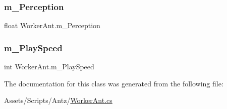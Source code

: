 \mbox{\label{class_worker_ant_ac8f5e0080f43089ba4ea7dcedc399a03}} 
\subsubsection{\texorpdfstring{m\_Perception}{m\_Perception}}
{\footnotesize\ttfamily float Worker\+Ant.\+m\+\_\+\+Perception}

\mbox{\label{class_worker_ant_ac64e685cce8ea571a1f79b9958a1aeb2}} 
\subsubsection{\texorpdfstring{m\_PlaySpeed}{m\_PlaySpeed}}
{\footnotesize\ttfamily int Worker\+Ant.\+m\+\_\+\+Play\+Speed}



The documentation for this class was generated from the following file\+:\begin{DoxyCompactItemize}
\item 
Assets/\+Scripts/\+Antz/\mbox{\hyperlink{_worker_ant_8cs}{Worker\+Ant.\+cs}}\end{DoxyCompactItemize}
